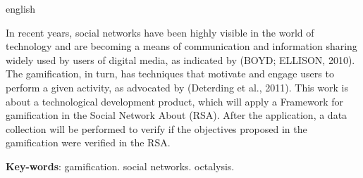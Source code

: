 \begin{resumo}[Abstract]
 \begin{otherlanguage*}{english}


In recent years, social networks have been highly visible in the world of technology and are becoming a means of communication and information sharing widely used by users of digital media, as indicated by (BOYD; ELLISON, 2010). The gamification, in turn, has techniques that motivate and engage users to perform a given activity, as advocated by (Deterding et al., 2011). This work is about a technological development product, which will apply a Framework for gamification in the Social Network About (RSA). After the application, a data collection will be performed to verify if the objectives proposed in the gamification were verified in the RSA.

   \vspace{\onelineskip}
 
   \noindent 
   \textbf{Key-words}: gamification. social networks. octalysis.
 \end{otherlanguage*}
\end{resumo}
